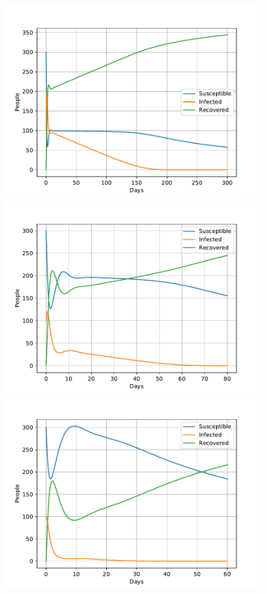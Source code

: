 \documentclass[a4paper]{article}
\begin{document}
\begin{figure}[!htb]
	\centering 
	\includegraphics[scale=0.56]{../plots/opp_e_A2.pdf}
	\includegraphics[scale=0.56]{../plots/opp_e_B2.pdf}	
	\includegraphics[scale=0.56]{../plots/opp_e_C2.pdf}

\end{figure}
\end{document}

